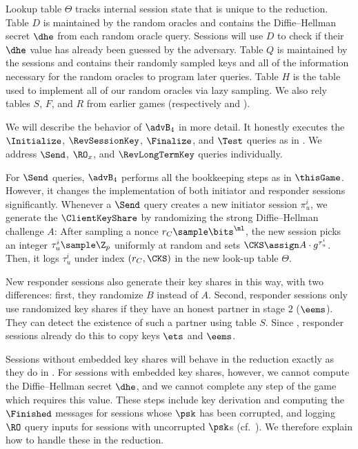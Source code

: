 Lookup table $\Theta$ tracks internal session state that is unique to the reduction.
Table $D$ is maintained by the random oracles and contains the Diffie--Hellman secret $\dhe$ from each random oracle query.
Sessions will use $D$ to check if their $\dhe$ value has already been guessed by the adversary.
Table $Q$ is maintained by the sessions and contains their randomly sampled keys and all of the information necessary for the random oracles to program later queries.
Table $H$ is the table used to implement all of our random oracles via lazy sampling.
We also rely tables $S$, $F$, and $R$ from earlier games (respectively  and ).


We will describe the behavior of $\advB_4$ in more detail.
It honestly executes the $\Initialize$, $\RevSessionKey$, $\Finalize$, and $\Test$ queries as in \thisGame.
We address $\Send$, $\RO_x$, and $\RevLongTermKey$ queries individually.

For $\Send$ queries, $\advB_4$ performs all the bookkeeping steps as in $\thisGame$.
However, it changes the implementation of both initiator and responder sessions significantly.
Whenever a $\Send$ query creates a new initiator session $\pi_u^i$, we generate the $\ClientKeyShare$ by randomizing the strong Diffie--Hellman challenge $A$:
After sampling a nonce $r_C\sample \bits^{\nl}$, the new session picks an integer  $\tau_u^i \sample \Z_p$ uniformly at random and sets $\CKS \assign A \cdot g^{\tau_u^i}$.
Then, it logs $\tau_u^i$ under index $(r_C, \CKS)$ in the new look-up table $\Theta$.

New responder sessions also generate their key shares in this way, with two differences: first, they randomize $B$ instead of $A$.
Second, responder sessions only use randomized key shares if they have an honest partner in stage $2$ ($\eems$).
They can detect the existence of such a partner using table $S$.
Since , responder sessions already do this to copy keys $\ets$ and $\eems$.

Sessions without embedded key shares will behave in the reduction exactly as they do in \thisGame.
For sessions with embedded key shares, however, we cannot compute the Diffie--Hellman secret $\dhe$, and we cannot complete any step of the game which requires this value.
These steps include key derivation and computing the $\Finished$ messages for sessions whose $\psk$ has been corrupted, and logging $\RO$ query inputs for sessions with uncorrupted $\psk$s (cf.\ ).
We therefore explain how to handle these in the reduction.

